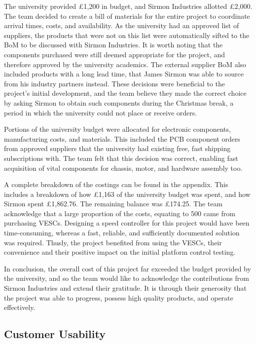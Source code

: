 \documentclass [12pt]{article}
\begin{document}
The university provided £1,200 in budget, and Sirmon Industries allotted £2,000. The team decided to create a bill of materials for the entire project to coordinate arrival times, costs, and availability. As the university had an approved list of suppliers, the products that were not on this list were automatically sifted to the BoM to be discussed with Sirmon Industries. It is worth noting that the components purchased were still deemed appropriate for the project, and therefore approved by the university academics. The external supplier BoM also included products with a long lead time, that James Sirmon was able to source from his industry partners instead. These decisions were beneficial to the project’s initial development, and the team believe they made the correct choice by asking Sirmon to obtain such components during the Christmas break, a period in which the university could not place or receive orders.  

Portions of the university budget were allocated for electronic components, manufacturing costs, and materials. This included the PCB component orders from approved suppliers that the university had existing free, fast shipping subscriptions with. The team felt that this decision was correct, enabling fast acquisition of vital components for chassis, motor, and hardware assembly too.  

A complete breakdown of the costings can be found in the appendix. This includes a breakdown of how £1,163 of the university budget was spent, and how Sirmon spent £1,862.76. The remaining balance was £174.25. The team acknowledge that a large proportion of the costs, equating to 500 came from purchasing VESCs. Designing a speed controller for this project would have been time-consuming, whereas a fast, reliable, and sufficiently documented solution was required. Thusly, the project benefited from using the VESCs, their convenience and their positive impact on the initial platform control testing.

In conclusion, the overall cost of this project far exceeded the budget provided by the university, and so the team would like to acknowledge the contributions from Sirmon Industries and extend their gratitude. It is through their generosity that the project was able to progress, possess high quality products, and operate effectively.  

\subsection{Customer Usability}
\end{document}
